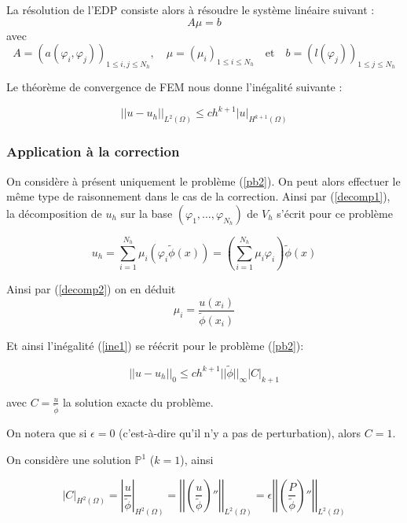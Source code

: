 La résolution de l'EDP consiste alors à résoudre le système linéaire suivant :
$$A\mu=b$$
avec
$$A=(a(\varphi_i,\varphi_j))_{1\le i,j\le N_h}, \quad \mu=(\mu_i)_{1\le i\le N_h} \quad \text{et} \quad b=(l(\varphi_j))_{1\le j\le N_h}$$

Le théorème de convergence de FEM nous donne l'inégalité suivante :

\begin{equation}
	||u-u_h||_{L^2(\Omega)}\le ch^{k+1}|u|_{H^{k+1}(\Omega)} \label{ine1}
\end{equation}

\subsubsection*{Application à la correction}

On considère à présent uniquement le problème (\ref{pb2}). On peut alors effectuer le même type de raisonnement dans le cas de la correction. Ainsi par (\ref{decomp1}), la décomposition de $u_h$ sur la base $(\varphi_1,\dots,\varphi_{N_h})$ de $V_h$ s'écrit pour ce problème

\begin{equation}
	u_h=\sum_{i=1}^{N_h}\mu_i(\varphi_i\tilde{\phi}(x))=\left(\sum_{i=1}^{N_h}\mu_i\varphi_i\right)\tilde{\phi}(x) \label{decomp2}
\end{equation}

Ainsi par (\ref{decomp2}) on en déduit
$$\mu_i=\frac{u(x_i)}{\tilde{\phi}(x_i)}$$

Et ainsi l'inégalité (\ref{ine1}) se réécrit pour le problème (\ref{pb2}):

\begin{equation}
	\left|\left|u-u_h\right|\right|_0\le ch^{k+1}||\tilde{\phi}||_\infty\left|C\right|_{k+1}
	\label{ine2}
\end{equation}

avec $C=\frac{u}{\tilde{\phi}}$ la solution exacte du problème.

\begin{Rem}
	On notera que si $\epsilon=0$ (c'est-à-dire qu'il n'y a pas de perturbation), alors $C=1$.
\end{Rem}

On considère une solution $\mathbb{P}^1$ ($k=1$), ainsi

\begin{equation}
	|C|_{H^2(\Omega)}=\left|\frac{u}{\tilde{\phi}}\right|_{H^2(\Omega)}=\left|\left|\left(\frac{u}{\tilde{\phi}}\right)''\right|\right|_{L^2(\Omega)}=\epsilon\left|\left|\left(\frac{P}{\tilde{\phi}}\right)''\right|\right|_{L^2(\Omega)} \label{der1}
\end{equation}

